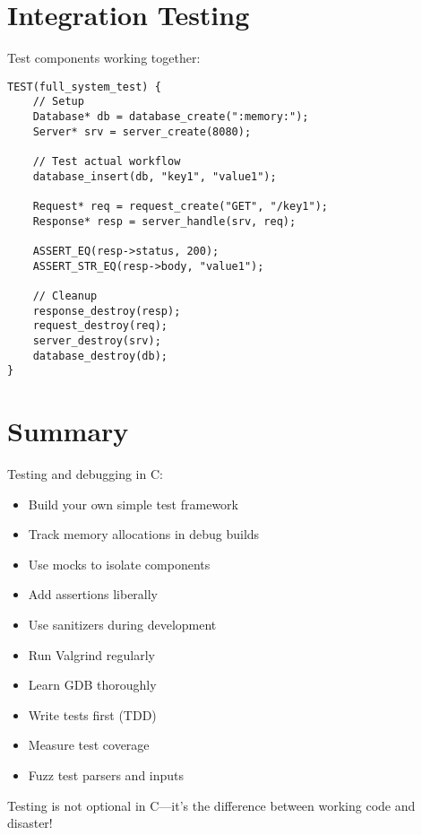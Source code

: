 \section{Integration Testing}

Test components working together:

\begin{lstlisting}
TEST(full_system_test) {
    // Setup
    Database* db = database_create(":memory:");
    Server* srv = server_create(8080);

    // Test actual workflow
    database_insert(db, "key1", "value1");

    Request* req = request_create("GET", "/key1");
    Response* resp = server_handle(srv, req);

    ASSERT_EQ(resp->status, 200);
    ASSERT_STR_EQ(resp->body, "value1");

    // Cleanup
    response_destroy(resp);
    request_destroy(req);
    server_destroy(srv);
    database_destroy(db);
}
\end{lstlisting}

\section{Summary}

Testing and debugging in C:

\begin{itemize}
    \item Build your own simple test framework
    \item Track memory allocations in debug builds
    \item Use mocks to isolate components
    \item Add assertions liberally
    \item Use sanitizers during development
    \item Run Valgrind regularly
    \item Learn GDB thoroughly
    \item Write tests first (TDD)
    \item Measure test coverage
    \item Fuzz test parsers and inputs
\end{itemize}

Testing is not optional in C—it's the difference between working code and disaster!
